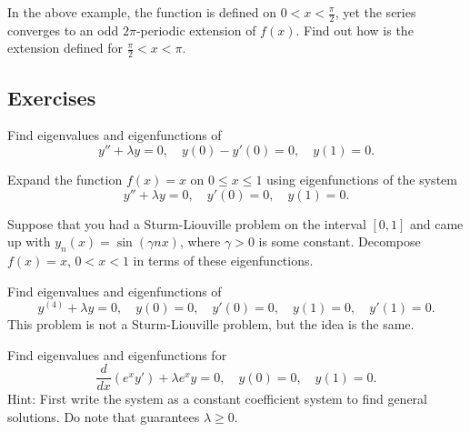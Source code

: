 \documentclass[12pt]{book}
\begin{document}
\begin{exercise}[challenging]
In the above example, the function is defined on $0 < x < \frac{\pi}{2}$,
yet the series converges to an odd $2\pi$-periodic extension of $f(x)$.
Find out how is the extension defined for $\frac{\pi}{2} < x < \pi$.
\end{exercise}

\subsection{Exercises}

\begin{exercise}
Find eigenvalues and eigenfunctions of
\begin{equation*}
y''+\lambda y = 0, \quad y(0)- y'(0) = 0, \quad y(1) = 0 .
\end{equation*}
\end{exercise}

\begin{exercise}
Expand the function $f(x) = x$ on $0 \leq x \leq 1$ using eigenfunctions
of the system
\begin{equation*}
y'' + \lambda y = 0, \quad y'(0) = 0, \quad y(1) = 0 .
\end{equation*}
\end{exercise}

\begin{exercise}
Suppose that you had a Sturm-Liouville problem on the interval
$[0,1]$ and came up with
$y_n(x) = \sin (\gamma n x)$, where $\gamma > 0$ is some constant.
Decompose $f(x) = x$, $0 < x < 1$ in terms of these eigenfunctions.
\end{exercise}

\begin{exercise}
Find eigenvalues and eigenfunctions of
\begin{equation*}
y^{(4)}+\lambda y = 0, \quad y(0) = 0, \quad y'(0) = 0, \quad y(1) = 0, \quad
y'(1) = 0 .
\end{equation*}
This problem is not a Sturm-Liouville problem, but the idea is the same.
\end{exercise}

\begin{exercise}
Find eigenvalues and eigenfunctions for
\begin{equation*}
\frac{d}{dx} (e^x y') + \lambda e^x y = 0, \quad y(0) = 0, \quad y(1) = 0 .
\end{equation*}
Hint: First write the system as a constant coefficient system to find
general solutions.  Do note that  guarantees $\lambda \geq 0$.
\end{exercise}
\end{document}
